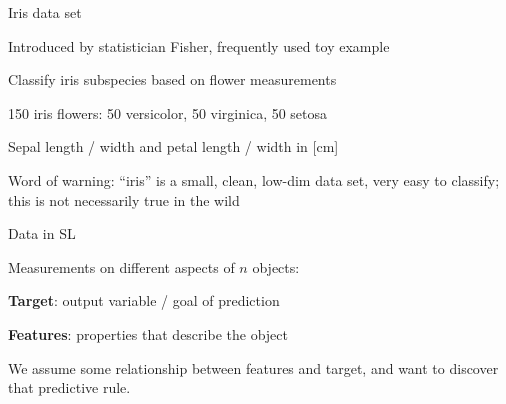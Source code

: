 \documentclass[11pt,compress,t,notes=noshow, xcolor=table]{beamer}
\begin{document}


\begin{framei}{Iris data set}
\item Introduced by statistician Fisher, frequently used toy example
\item Classify iris subspecies based on flower measurements
\item 150 iris flowers: 50 versicolor, 50 virginica, 50 setosa
\item Sepal length / width and petal length / width in [cm]
\vfill
{}
\item Word of warning: ``iris'' is a small, clean, low-dim data set, very easy to classify; this is not necessarily true in the wild 
\end{framei}


\begin{framei}{Data in SL}
\item Measurements on different aspects of $n$ objects:
\begin{itemizeL}
\item \textbf{Target}: output variable / goal of prediction
\item \textbf{Features}: properties that describe the object
\end{itemizeL}
\item We assume some relationship between features and target, and want to discover that predictive rule.
\vfill
{}
\end{framei}
\end{document}
